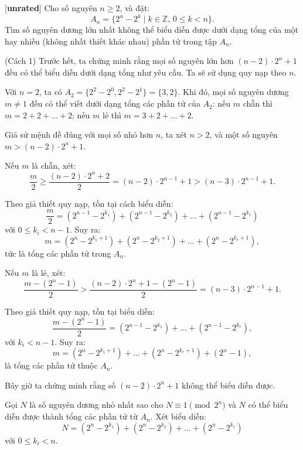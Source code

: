 \documentclass[../01-divisibility.tex]{subfiles}
\begin{document}
\begin{example*}\label{example:IND-2015-TST2-P1}[\textbf{unrated}]\footnotemark
	Cho số nguyên \( n \geq 2 \), và đặt:
	\[
		A_n = \{2^n - 2^k \mid k \in \mathbb{Z},\, 0 \leq k < n \}.
	\]
	Tìm số nguyên dương lớn nhất không thể biểu diễn được dưới dạng tổng của một hay nhiều (không nhất thiết khác nhau) phần tử trong tập \( A_n \).
\end{example*}

\begin{soln}(Cách 1)
	Trước hết, ta chứng minh rằng mọi số nguyên lớn hơn \( (n - 2) \cdot 2^n + 1 \) đều có thể biểu diễn dưới dạng tổng như yêu cầu.
	Ta sẽ sử dụng quy nạp theo \( n \).

	Với \( n = 2 \), ta có \( A_2 = \{2^2 - 2^0, 2^2 - 2^1\} = \{3, 2\} \).
	Khi đó, mọi số nguyên dương \( m \neq 1 \) đều có thể viết dưới dạng tổng các phần tử của \( A_2 \):
	nếu \( m \) chẵn thì \( m = 2 + 2 + \dots + 2 \); nếu \( m \) lẻ thì \( m = 3 + 2 + \dots + 2 \).

	Giả sử mệnh đề đúng với mọi số nhỏ hơn \( n \), ta xét \( n > 2 \), và một số nguyên \( m > (n - 2) \cdot 2^n + 1 \).

	Nếu \( m \) là chẵn, xét:
	\[
		\frac{m}{2} \geq \frac{(n - 2) \cdot 2^n + 2}{2} = (n - 2) \cdot 2^{n-1} + 1 > (n - 3) \cdot 2^{n-1} + 1.
	\]
	
	Theo giả thiết quy nạp, tồn tại cách biểu diễn:
	\[
		\frac{m}{2} = (2^{n-1} - 2^{k_1}) + (2^{n-1} - 2^{k_2}) + \dots + (2^{n-1} - 2^{k_r})
	\]
	với \( 0 \leq k_i < n - 1 \). Suy ra:
	\[
		m = (2^n - 2^{k_1 + 1}) + (2^n - 2^{k_2 + 1}) + \dots + (2^n - 2^{k_r + 1}),
	\]
	tức là tổng các phần tử trong \( A_n \).

	Nếu \( m \) là lẻ, xét:
	\[
		\frac{m - (2^n - 1)}{2} > \frac{(n - 2) \cdot 2^n + 1 - (2^n - 1)}{2} = (n - 3) \cdot 2^{n-1} + 1.
	\]

	Theo giả thiết quy nạp, tồn tại biểu diễn:
	\[
		\frac{m - (2^n - 1)}{2} = (2^{n-1} - 2^{k_1}) + \dots + (2^{n-1} - 2^{k_r}),
	\]
	với \( k_i < n - 1 \). Suy ra:
	\[
		m = (2^n - 2^{k_1 + 1}) + \dots + (2^n - 2^{k_r + 1}) + (2^n - 1),
	\]
	là tổng các phần tử thuộc \( A_n \).


	Bây giờ ta chứng minh rằng số \( (n - 2) \cdot 2^n + 1 \) không thể biểu diễn được.

	Gọi \( N \) là số nguyên dương nhỏ nhất sao cho \( N \equiv 1 \pmod{2^n} \) và \( N \) có thể biểu diễn được thành tổng các phần tử từ \( A_n \). Xét biểu diễn:
	\[
		N = (2^n - 2^{k_1}) + (2^n - 2^{k_2}) + \dots + (2^n - 2^{k_r}) \tag{1}
	\]
	với \( 0 \leq k_i < n \).


\end{soln}
\end{document}
